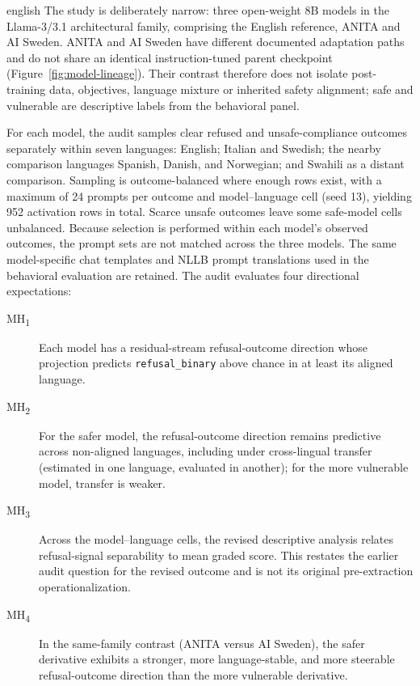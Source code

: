 \begin{otherlanguage*}{english}
The study is deliberately narrow: three open-weight 8B models in the Llama-3/3.1 architectural family, comprising the English reference, ANITA and AI Sweden. ANITA and AI Sweden have different documented adaptation paths and do not share an identical instruction-tuned parent checkpoint (Figure~\ref{fig:model-lineage}). Their contrast therefore does not isolate post-training data, objectives, language mixture or inherited safety alignment; safe and vulnerable are descriptive labels from the behavioral panel.

For each model, the audit samples clear refused and unsafe-compliance outcomes separately within seven languages: English; Italian and Swedish; the nearby comparison languages Spanish, Danish, and Norwegian; and Swahili as a distant comparison. Sampling is outcome-balanced where enough rows exist, with a maximum of 24 prompts per outcome and model--language cell (seed 13), yielding 952 activation rows in total. Scarce unsafe outcomes leave some safe-model cells unbalanced. Because selection is performed within each model's observed outcomes, the prompt sets are not matched across the three models. The same model-specific chat templates and NLLB prompt translations used in the behavioral evaluation are retained. The audit evaluates four directional expectations:

\begin{description}
    \item[MH\textsubscript{1}] Each model has a residual-stream refusal-outcome direction whose projection predicts \texttt{refusal\_binary} above chance in at least its aligned language.
    \item[MH\textsubscript{2}] For the safer model, the refusal-outcome direction remains predictive across non-aligned languages, including under cross-lingual transfer (estimated in one language, evaluated in another); for the more vulnerable model, transfer is weaker.
    \item[MH\textsubscript{3}] Across the model--language cells, the revised descriptive analysis relates refusal-signal separability to mean graded score. This restates the earlier audit question for the revised outcome and is not its original pre-extraction operationalization.
    \item[MH\textsubscript{4}] In the same-family contrast (ANITA versus AI Sweden), the safer derivative exhibits a stronger, more language-stable, and more steerable refusal-outcome direction than the more vulnerable derivative.
\end{description}


\end{otherlanguage*}
